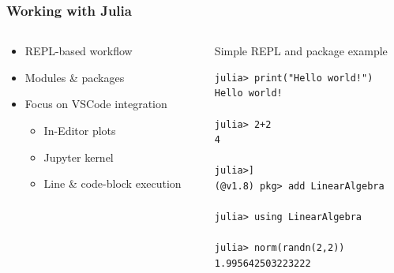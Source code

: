 \documentclass[compress,aspectratio=169]{beamer}
\begin{document}
\begin{frame}[fragile] %
    \frametitle{Working with Julia}
    \begin{columns}
        \begin{column}{0.4\textwidth}
            \begin{itemize}
                \item REPL-based workflow
                \item Modules \& packages
                \item Focus on VSCode integration
                    \begin{itemize}
                        \item In-Editor plots
                        \item Jupyter kernel
                        \item Line \& code-block execution
                    \end{itemize}
            \end{itemize}
        \end{column}
        \begin{column}{0.6\textwidth}
            Simple REPL and package example
            \begin{verbatim}
julia> print("Hello world!")
Hello world!

julia> 2+2
4

julia>]
(@v1.8) pkg> add LinearAlgebra

julia> using LinearAlgebra

julia> norm(randn(2,2))
1.995642503223222
            \end{verbatim}

        \end{column}
    \end{columns}
\end{frame}
\end{document}
